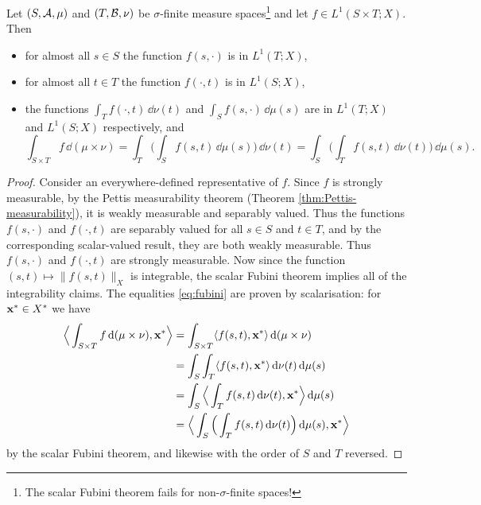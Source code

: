\begin{prop}[Fubini]
  Let $(S,\mathcal{A},\mu)$ and $(T,\mathcal{B},\nu)$ be $\sigma$-finite measure spaces\footnote{The scalar Fubini theorem fails for non-$\sigma$-finite spaces!} and let $f \in L^1(S \times T; X)$.
  Then
  \begin{itemize}
  \item for almost all $s \in S$ the function $f(s,\cdot)$ is in $L^1(T;X)$,
  \item for almost all $t \in T$ the function $f(\cdot,t)$ is in $L^1(S;X)$,
  \item the functions $\int_T f(\cdot,t) \, \dd\nu(t)$ and $\int_S f(s,\cdot) \, \dd\mu(s)$ are in $L^1(T;X)$ and $L^1(S;X)$ respectively, and
    \begin{equation}\label{eq:fubini}
      \int_{S \times T} f \, \dd(\mu \times \nu) = \int_T \Big(  \int_S f(s,t) \, \dd\mu(s) \Big) \, \dd\nu(t) = \int_S \Big(\int_T f(s,t) \, \dd\nu(t) \Big) \, \dd\mu(s).
    \end{equation}
  \end{itemize}
\end{prop}

\begin{proof}
  Consider an everywhere-defined representative of $f$.
  Since $f$ is strongly measurable, by the Pettis measurability theorem (Theorem \ref{thm:Pettis-measurability}), it is weakly measurable and separably valued.
  Thus the functions $f(s,\cdot)$ and $f(\cdot,t)$ are separably valued for all $s \in S$ and $t \in T$, and by the corresponding scalar-valued result, they are both weakly measurable.
  Thus $f(s,\cdot)$ and $f(\cdot,t)$ are strongly measurable.
  Now since the function $(s,t) \mapsto \|f(s,t)\|_X$ is integrable, the scalar Fubini theorem implies all of the integrability claims.
  The equalities \eqref{eq:fubini} are proven by scalarisation: for $\mathbf{x}^* \in X^*$ we have
  \begin{equation*}
    \begin{aligned}
      \Big\langle \int_{S \times T} f \, \mathrm{d}(\mu \times \nu) , \mathbf{x}^* \Big\rangle
      &= \int_{S \times T} \langle f(s,t), \mathbf{x}^* \rangle \, \mathrm{d}(\mu \times \nu) \\
      &= \int_{S} \int_{T} \langle f(s,t), \mathbf{x}^* \rangle \, \mathrm{d}\nu(t) \, \mathrm{d}\mu(s) \\
      &= \int_{S} \Big\langle \int_{T} f(s,t) \, \mathrm{d}\nu(t) , \mathbf{x}^* \Big\rangle \, \mathrm{d}\mu(s) \\
      &= \Big\langle \int_S \Big(\int_{T} f(s,t) \, \mathrm{d}\nu(t) \Big)\, \mathrm{d}\mu(s) , \mathbf{x}^* \Big\rangle
  \end{aligned}
  \end{equation*}
  by the scalar Fubini theorem, and likewise with the order of $S$ and $T$ reversed.
\end{proof}

